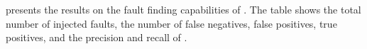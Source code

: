 % 


  presents the results on the fault finding capabilities of \tool.
The table shows the total number of injected faults, the number of false negatives, false positives, true positives, and the precision and recall of \tool. 

